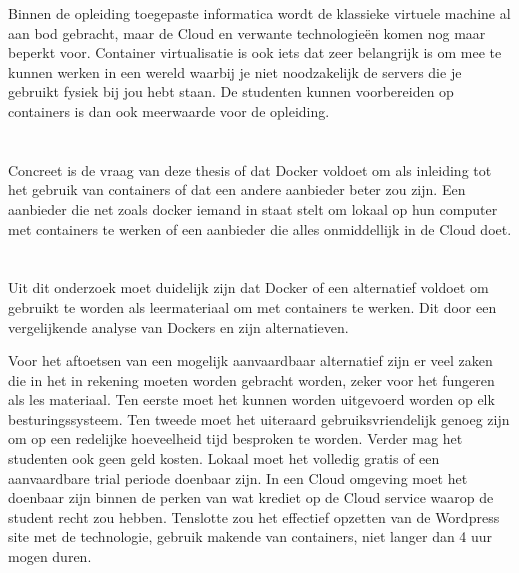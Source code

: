 Binnen de opleiding toegepaste informatica wordt de klassieke virtuele machine al aan bod gebracht, maar de Cloud en verwante technologieën komen nog maar beperkt voor. Container virtualisatie is ook  iets dat zeer belangrijk is om mee te kunnen werken in een wereld waarbij je niet noodzakelijk de servers die je gebruikt fysiek bij jou hebt staan. De studenten kunnen voorbereiden op containers is dan ook meerwaarde voor de opleiding.

\section{}
\label{sec:onderzoeksvraag}

Concreet is de vraag van deze thesis of dat Docker voldoet om als inleiding tot het gebruik van containers of dat een andere aanbieder beter zou zijn. Een aanbieder die net zoals docker iemand in staat stelt om lokaal op hun computer met containers te werken of een aanbieder die alles onmiddellijk  in de Cloud doet.

\section{}
\label{sec:onderzoeksdoelstelling}

Uit dit onderzoek moet duidelijk zijn dat Docker of een alternatief voldoet om gebruikt te worden als leermateriaal om met containers te werken. Dit door een vergelijkende analyse van Dockers en zijn alternatieven.

Voor het aftoetsen van een mogelijk aanvaardbaar alternatief zijn er veel zaken die in het in rekening moeten worden gebracht worden, zeker voor het fungeren als les materiaal. Ten eerste moet het kunnen worden uitgevoerd worden op elk besturingssysteem. Ten tweede moet het uiteraard gebruiksvriendelijk genoeg zijn om op een redelijke hoeveelheid tijd besproken te worden.  Verder mag het studenten ook geen geld kosten. Lokaal moet het volledig gratis of een aanvaardbare trial periode doenbaar zijn. In een Cloud omgeving moet het doenbaar zijn binnen de perken van wat krediet op de Cloud service waarop de student recht zou hebben. Tenslotte zou het effectief opzetten van de Wordpress site met de technologie, gebruik makende van containers, niet langer dan 4 uur mogen duren.

